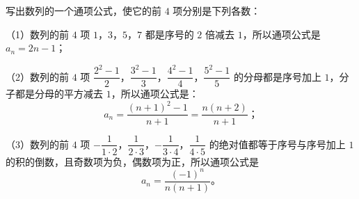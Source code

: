 \liti 写出数列的一个通项公式，使它的前 $4$ 项分别是下列各数：
\begin{xiaoxiaotis}




\end{xiaoxiaotis}

\jie （1）数列的前 $4$ 项 $1$，$3$，$5$，$7$ 都是序号的 $2$ 倍减去 $1$，所以通项公式是 $a_n = 2n - 1$；

（2）数列的前 $4$ 项 $\dfrac{2^2 - 1}{2}$，$\dfrac{3^2 - 1}{3}$，$\dfrac{4^2 - 1}{4}$，$\dfrac{5^2 - 1}{5}$
的分母都是序号加上 $1$，分子都是分母的平方减去 $1$，所以通项公式是：
$$ a_n = \dfrac{(n+1)^2 - 1}{n + 1} = \dfrac{n(n + 2)}{n + 1} \text{；}$$

（3）数列的前 $4$ 项 $-\dfrac{1}{1 \cdot 2}$，$\dfrac{1}{2 \cdot 3}$，$-\dfrac{1}{3 \cdot 4}$，$\dfrac{1}{4 \cdot 5}$
的绝对值都等于序号与序号加上 $1$ 的积的倒数，且奇数项为负，偶数项为正，所以通项公式是
$$ a_n = \dfrac{(-1)^n}{n(n + 1)} \text{。}$$


\lianxi

